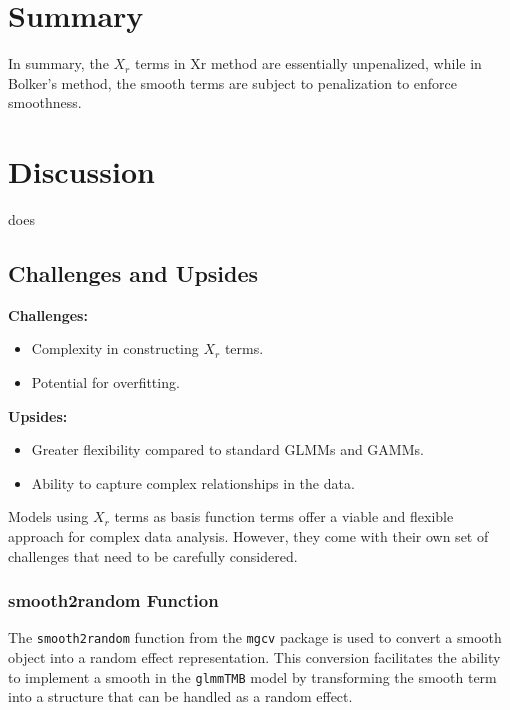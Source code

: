 \documentclass{article}
\begin{document}
\section{Summary}

In summary, the \(X_r\) terms in Xr method are essentially unpenalized, while in Bolker's method, the smooth terms are subject to penalization to enforce smoothness.












\section{Discussion}

does

\subsection{Challenges and Upsides}

\textbf{Challenges:}
\begin{itemize}
    \item Complexity in constructing \(X_r\) terms.
    \item Potential for overfitting.
\end{itemize}

\textbf{Upsides:}
\begin{itemize}
    \item Greater flexibility compared to standard GLMMs and GAMMs.
    \item Ability to capture complex relationships in the data.
\end{itemize}


Models using \(X_r\) terms as basis function terms offer a viable and flexible approach for complex data analysis. However, they come with their own set of challenges that need to be carefully considered.


\subsubsection{smooth2random Function}
The \texttt{smooth2random} function from the \texttt{mgcv} package is used to convert a smooth object into a random effect representation. This conversion facilitates the ability to implement a smooth in the \texttt{glmmTMB} model by transforming the smooth term into a structure that can be handled as a random effect.
\end{document}
